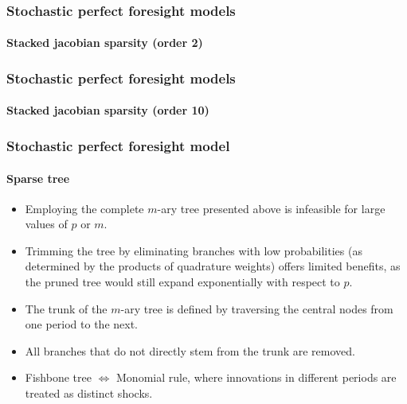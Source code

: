 \documentclass{beamer}
\begin{document}
\begin{frame}
   \frametitle{Stochastic perfect foresight models}
   \framesubtitle{Stacked jacobian sparsity (order 2)}
   \begin{center}
      \scalebox{.5}{
         }
   \end{center}

\end{frame}


\begin{frame}
   \frametitle{Stochastic perfect foresight models}
   \framesubtitle{Stacked jacobian sparsity (order 10)}
   \begin{center}
      \scalebox{.5}{
         }
   \end{center}

\end{frame}


\begin{frame}
   \frametitle{Stochastic perfect foresight model}
   \framesubtitle{Sparse tree}

   \begin{itemize}

      \item Employing the complete $m$-ary tree presented above is
            infeasible for large values of $p$ or $m$.\newline

      \item Trimming the tree by eliminating branches with low
            probabilities (as determined by the products of quadrature
            weights) offers limited benefits, as the pruned tree would still
            expand exponentially with respect to $p$.\newline

      \item The trunk of the $m$-ary tree is defined by traversing the
            central nodes from one period to the next.\newline

      \item All branches that do not directly stem from the trunk are
            removed.\newline

      \item Fishbone tree $\Leftrightarrow$ Monomial rule, where
            innovations in different periods are treated as distinct
            shocks.

   \end{itemize}

\end{frame}
\end{document}
